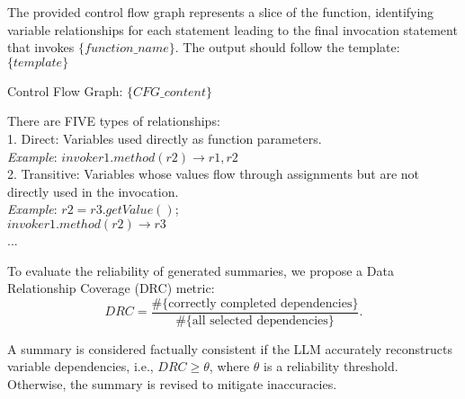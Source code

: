 \begin{tcolorbox}[title=Factual Consistency Verification Prompt, 
left=2pt, %
right=2pt, %
top=3pt, %
bottom=3pt, %
fonttitle=\small,
colback=gray!20, colframe=black, colbacktitle=black, coltitle=white, sharp corners, fontupper=\small, fontlower=\small, before upper=\raggedright, before lower=\raggedright]
The provided control flow graph represents a slice of the function, identifying variable relationships for each statement leading to the final invocation statement that invokes $\{function\_name\}$. The output should follow the template: $\{template\}$

Control Flow Graph: $\{CFG\_content\}$ 

There are FIVE types of relationships: \\
1. Direct: Variables used directly as function parameters.\\
\textit{Example}: $invoke r1.method(r2) \rightarrow {r1, r2}$ \\
2. Transitive: Variables whose values flow through assignments but are not directly used in the invocation. \\
\textit{Example}: $r2 = r3.getValue()$; \\
$invoke r1.method(r2) \rightarrow {r3}$ \\
...
\end{tcolorbox}

To evaluate the reliability of generated summaries, we propose a Data Relationship Coverage (DRC) metric:
\begin{equation}
DRC = \frac{\#\{\text{correctly completed dependencies}\}}{\#\{\text{all selected dependencies}\}}.
\end{equation}

A summary is considered factually consistent if the LLM accurately reconstructs variable dependencies, i.e., $DRC \ge \theta$, where $\theta$ is a reliability threshold. Otherwise, the summary is revised to mitigate inaccuracies.






